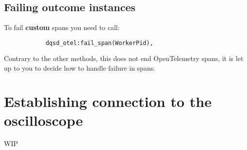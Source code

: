     \subsection{Failing outcome instances}
        To fail \textbf{custom} spans you need to call:
        \begin{verbatim}
            dqsd_otel:fail_span(WorkerPid),
        \end{verbatim}
        Contrary to the other methods, this does not end OpenTelemetry spans, it is let up to you to decide how to handle failure in spans.

\section{Establishing connection to the oscilloscope}
    WIP
